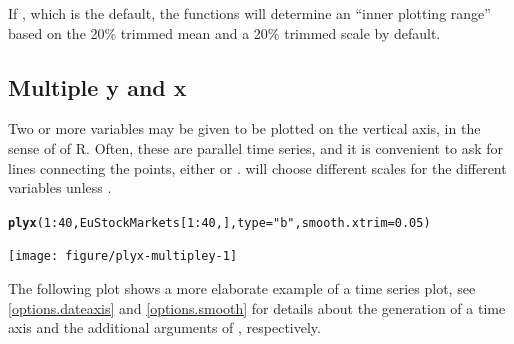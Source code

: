 \documentclass[11pt]{article}\usepackage[]{graphicx}\usepackage[]{color}
\makeatletter
\newcommand{\hlnum}[1]{\textcolor[rgb]{0.686,0.059,0.569}{#1}}%
\newcommand{\hlstr}[1]{\textcolor[rgb]{0.192,0.494,0.8}{#1}}%
\newcommand{\hlopt}[1]{\textcolor[rgb]{0,0,0}{#1}}%
\newcommand{\hlstd}[1]{\textcolor[rgb]{0.345,0.345,0.345}{#1}}%
\newcommand{\hlkwc}[1]{\textcolor[rgb]{0.333,0.667,0.333}{#1}}%
\newcommand{\hlkwd}[1]{\textcolor[rgb]{0.737,0.353,0.396}{\textbf{#1}}}%
\newenvironment{kframe}{%
 \def\at@end@of@kframe{}%
 \ifinner\ifhmode%
  \def\at@end@of@kframe{\end{minipage}}%
  \begin{minipage}{\columnwidth}%
 \fi\fi%
 \def\FrameCommand##1{\hskip\@totalleftmargin \hskip-\fboxsep
 \colorbox{shadecolor}{##1}\hskip-\fboxsep
     \hskip-\linewidth \hskip-\@totalleftmargin \hskip\columnwidth}%
 \MakeFramed {\advance\hsize-\width
   \@totalleftmargin\z@ \linewidth\hsize
   \@setminipage}}%
 {\par\unskip\endMakeFramed%
 \at@end@of@kframe}
\newenvironment{knitrout}{}{} %
\makeatother
\begin{document}
If , which is the default, the  functions
will determine an ``inner plotting range'' based on 
the 20\% trimmed mean and a 20\% trimmed scale by default.



\subsection{Multiple y and x}
Two or more variables may be given to be plotted on the vertical axis,
in the sense of  of R.
Often, these are parallel time series, and it is convenient to ask for 
lines connecting the points, either  or .
 will choose different scales for the different variables unless
.

\begin{knitrout}
\color{fgcolor}\begin{kframe}
\begin{alltt}
\hlkwd{plyx}\hlstd{(}\hlnum{1}\hlopt{:}\hlnum{40}\hlstd{, EuStockMarkets[}\hlnum{1}\hlopt{:}\hlnum{40}\hlstd{,],} \hlkwc{type}\hlstd{=}\hlstr{"b"}\hlstd{,} \hlkwc{smooth.xtrim}\hlstd{=}\hlnum{0.05}\hlstd{)}
\end{alltt}
\end{kframe}
\texttt{[image: figure/plyx-multipley-1]} 

\end{knitrout}

The following plot shows a more elaborate example of a time series plot,
see \ref{options.dateaxis} and \ref{options.smooth}
for details about the generation of a time axis and
the additional arguments of , respectively.
\end{document}
